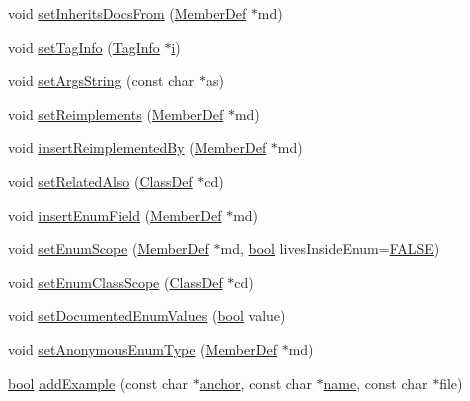\begin{DoxyCompactItemize}
\item 
void \hyperlink{class_member_def_ac954130cf0256b3a62d3352a2be509c6}{set\+Inherits\+Docs\+From} (\hyperlink{class_member_def}{Member\+Def} $\ast$md)
\item 
void \hyperlink{class_member_def_a85ece0f615fcfea7afc4ec292c6c178d}{set\+Tag\+Info} (\hyperlink{struct_tag_info}{Tag\+Info} $\ast$\hyperlink{060__command__switch_8tcl_a8c90afd4641b25be86bd09983c3cbee0}{i})
\item 
void \hyperlink{class_member_def_a267f127e937748855fae0eef67d00d15}{set\+Args\+String} (const char $\ast$as)
\item 
void \hyperlink{class_member_def_a09e58c33ed93f5594e2ff977f3c9f0e5}{set\+Reimplements} (\hyperlink{class_member_def}{Member\+Def} $\ast$md)
\item 
void \hyperlink{class_member_def_a6f07bd65e01b676333cef75724a24de2}{insert\+Reimplemented\+By} (\hyperlink{class_member_def}{Member\+Def} $\ast$md)
\item 
void \hyperlink{class_member_def_a3cd1972eb433e20bfdd107e3df7a22e6}{set\+Related\+Also} (\hyperlink{class_class_def}{Class\+Def} $\ast$cd)
\item 
void \hyperlink{class_member_def_ac4380f8c77ff8bcf2082ed4b9cb08d3c}{insert\+Enum\+Field} (\hyperlink{class_member_def}{Member\+Def} $\ast$md)
\item 
void \hyperlink{class_member_def_a11a7cb96316131c806c6d4a12a5e11fd}{set\+Enum\+Scope} (\hyperlink{class_member_def}{Member\+Def} $\ast$md, \hyperlink{qglobal_8h_a1062901a7428fdd9c7f180f5e01ea056}{bool} lives\+Inside\+Enum=\hyperlink{qglobal_8h_a10e004b6916e78ff4ea8379be80b80cc}{F\+A\+L\+S\+E})
\item 
void \hyperlink{class_member_def_a26523e3913336b997eecc967390c28c9}{set\+Enum\+Class\+Scope} (\hyperlink{class_class_def}{Class\+Def} $\ast$cd)
\item 
void \hyperlink{class_member_def_a37b03f99ebbd0aef3b66236a39f542b3}{set\+Documented\+Enum\+Values} (\hyperlink{qglobal_8h_a1062901a7428fdd9c7f180f5e01ea056}{bool} value)
\item 
void \hyperlink{class_member_def_a20fe732daa20d651f2ec06b1f7409d38}{set\+Anonymous\+Enum\+Type} (\hyperlink{class_member_def}{Member\+Def} $\ast$md)
\item 
\hyperlink{qglobal_8h_a1062901a7428fdd9c7f180f5e01ea056}{bool} \hyperlink{class_member_def_aec3154d3fd600954a9c18e5d2f75228c}{add\+Example} (const char $\ast$\hyperlink{class_member_def_a09dd84c129c5b2cdd39fca8d9ef096a8}{anchor}, const char $\ast$\hyperlink{class_definition_a99481361779e85f0c1556709de7d9e5b}{name}, const char $\ast$file)

\end{DoxyCompactItemize}
